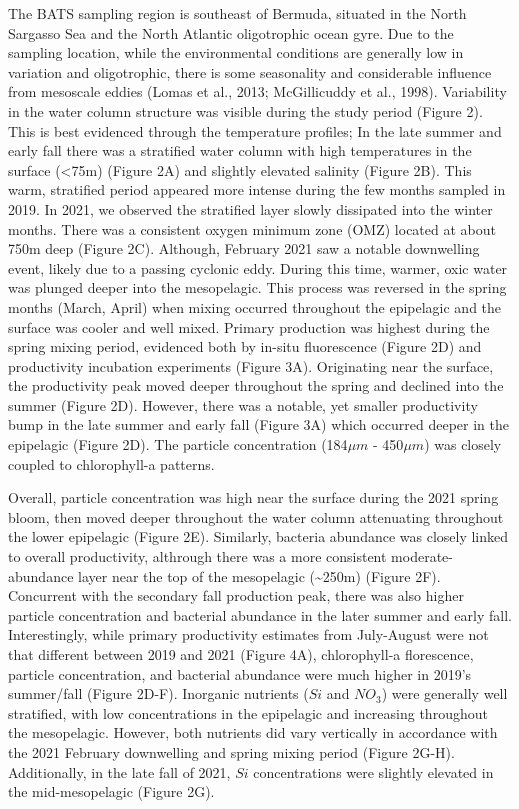 \documentclass[
]{article}
\begin{document}
The BATS sampling region is southeast of Bermuda, situated in the North
Sargasso Sea and the North Atlantic oligotrophic ocean gyre. Due to the
sampling location, while the environmental conditions are generally low
in variation and oligotrophic, there is some seasonality and
considerable influence from mesoscale eddies (Lomas et al., 2013;
McGillicuddy et al., 1998). Variability in the water column structure
was visible during the study period (Figure 2). This is best evidenced
through the temperature profiles; In the late summer and early fall
there was a stratified water column with high temperatures in the
surface (\textless75m) (Figure 2A) and slightly elevated salinity
(Figure 2B). This warm, stratified period appeared more intense during
the few months sampled in 2019. In 2021, we observed the stratified
layer slowly dissipated into the winter months. There was a consistent
oxygen minimum zone (OMZ) located at about 750m deep (Figure 2C).
Although, February 2021 saw a notable downwelling event, likely due to a
passing cyclonic eddy. During this time, warmer, oxic water was plunged
deeper into the mesopelagic. This process was reversed in the spring
months (March, April) when mixing occurred throughout the epipelagic and
the surface was cooler and well mixed. Primary production was highest
during the spring mixing period, evidenced both by in-situ fluorescence
(Figure 2D) and productivity incubation experiments (Figure 3A).
Originating near the surface, the productivity peak moved deeper
throughout the spring and declined into the summer (Figure 2D). However,
there was a notable, yet smaller productivity bump in the late summer
and early fall (Figure 3A) which occurred deeper in the epipelagic
(Figure 2D). The particle concentration (184\(\mu m\) - 450\(\mu m\))
was closely coupled to chlorophyll-a patterns.

Overall, particle concentration was high near the surface during the
2021 spring bloom, then moved deeper throughout the water column
attenuating throughout the lower epipelagic (Figure 2E). Similarly,
bacteria abundance was closely linked to overall productivity, althrough
there was a more consistent moderate-abundance layer near the top of the
mesopelagic (\textasciitilde250m) (Figure 2F). Concurrent with the
secondary fall production peak, there was also higher particle
concentration and bacterial abundance in the later summer and early
fall. Interestingly, while primary productivity estimates from
July-August were not that different between 2019 and 2021 (Figure 4A),
chlorophyll-a florescence, particle concentration, and bacterial
abundance were much higher in 2019's summer/fall (Figure 2D-F).
Inorganic nutrients (\(Si\) and \(NO_3\)) were generally well
stratified, with low concentrations in the epipelagic and increasing
throughout the mesopelagic. However, both nutrients did vary vertically
in accordance with the 2021 February downwelling and spring mixing
period (Figure 2G-H). Additionally, in the late fall of 2021, \(Si\)
concentrations were slightly elevated in the mid-mesopelagic (Figure
2G).
\end{document}
